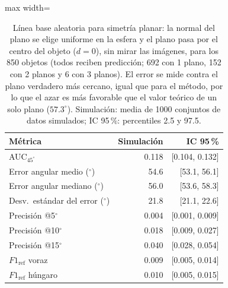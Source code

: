 
\begin{table}[htbp]
\centering
\caption{Línea base aleatoria para simetría planar: la normal del plano se elige uniforme en la esfera y el plano pasa por el centro del objeto ($d=0$), sin mirar las imágenes, para los 850 objetos (todos reciben predicción; 692 con 1 plano, 152 con 2 planos y 6 con 3 planos). El error se mide contra el plano verdadero más cercano, igual que para el método, por lo que el azar es más favorable que el valor teórico de un solo plano ($57.3^\circ$). Simulación: media de 1000 conjuntos de datos simulados; IC 95\,\%: percentiles 2.5 y 97.5.}
\label{tab:plane_azar}
\begin{adjustbox}{max width=\textwidth}
\begin{tabular}{lrr}
\toprule
Métrica & Simulación & IC 95\,\% \\
\midrule
AUC$_{45^\circ}$ & 0.118 & [0.104, 0.132] \\
Error angular medio ($^\circ$) & 54.6 & [53.1, 56.1] \\
Error angular mediano ($^\circ$) & 56.0 & [53.6, 58.3] \\
Desv.\ estándar del error ($^\circ$) & 21.8 & [21.1, 22.6] \\
Precisión @5$^\circ$ & 0.004 & [0.001, 0.009] \\
Precisión @10$^\circ$ & 0.018 & [0.009, 0.027] \\
Precisión @15$^\circ$ & 0.040 & [0.028, 0.054] \\
$F1_{\mathrm{ref}}$ voraz & 0.009 & [0.005, 0.014] \\
$F1_{\mathrm{ref}}$ húngaro & 0.010 & [0.005, 0.015] \\
\bottomrule
\end{tabular}
\end{adjustbox}
\end{table}

